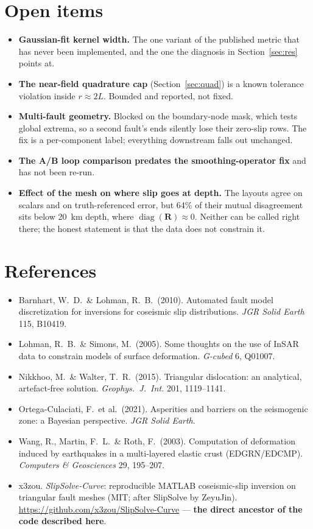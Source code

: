 \documentclass[11pt,a4paper]{article}
\newcommand{\R}{\mathbf{R}}
\begin{document}
\section{Open items}

\begin{itemize}\itemsep2pt
\item \textbf{Gaussian-fit kernel width.} The one variant of the published metric
      that has never been implemented, and the one the diagnosis in
      Section~\ref{sec:res} points at.
\item \textbf{The near-field quadrature cap} (Section~\ref{sec:quad}) is a known
      tolerance violation inside $r \approx 2L$. Bounded and reported, not fixed.
\item \textbf{Multi-fault geometry.} Blocked on the boundary-node mask, which
      tests global extrema, so a second fault's ends silently lose their
      zero-slip rows. The fix is a per-component label; everything downstream
      falls out unchanged.
\item \textbf{The A/B loop comparison predates the smoothing-operator fix} and
      has not been re-run.
\item \textbf{Effect of the mesh on where slip goes at depth.} The layouts agree
      on scalars and on truth-referenced error, but 64\% of their mutual
      disagreement sits below 20~km depth, where $\operatorname{diag}(\R)\approx 0$.
      Neither can be called right there; the honest statement is that the data
      does not constrain it.
\end{itemize}

\section*{References}
\small
\begin{itemize}\itemsep1pt
\item Barnhart, W.\ D.\ \& Lohman, R.\ B.\ (2010). Automated fault model discretization for
      inversions for coseismic slip distributions. \emph{JGR Solid Earth} 115, B10419.
\item Lohman, R.\ B.\ \& Simons, M.\ (2005). Some thoughts on the use of InSAR data to
      constrain models of surface deformation. \emph{G-cubed} 6, Q01007.
\item Nikkhoo, M.\ \& Walter, T.\ R.\ (2015). Triangular dislocation: an analytical,
      artefact-free solution. \emph{Geophys.\ J.\ Int.} 201, 1119--1141.
\item Ortega-Culaciati, F.\ et al.\ (2021). Asperities and barriers on the seismogenic
      zone: a Bayesian perspective. \emph{JGR Solid Earth}.
\item Wang, R., Martin, F.\ L.\ \& Roth, F.\ (2003). Computation of deformation induced by
      earthquakes in a multi-layered elastic crust (EDGRN/EDCMP).
      \emph{Computers \& Geosciences} 29, 195--207.
\item x3zou. \emph{SlipSolve-Curve}: reproducible MATLAB coseismic-slip inversion
      on triangular fault meshes (MIT; after SlipSolve by ZeyuJin).
      \url{https://github.com/x3zou/SlipSolve-Curve} --- \textbf{the direct
      ancestor of the code described here}.
\end{itemize}
\end{document}
